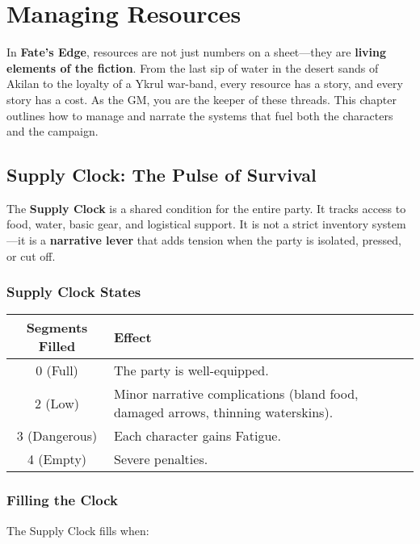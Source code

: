 \chapter{Managing Resources}

In \textbf{Fate's Edge}, resources are not just numbers on a sheet---they are \textbf{living elements of the fiction}. From the last sip of water in the desert sands of Akilan to the loyalty of a Ykrul war-band, every resource has a story, and every story has a cost. As the GM, you are the keeper of these threads. This chapter outlines how to manage and narrate the systems that fuel both the characters and the campaign.

\section*{Supply Clock: The Pulse of Survival}

The \textbf{Supply Clock} is a shared condition for the entire party. It tracks access to food, water, basic gear, and logistical support. It is not a strict inventory system---it is a \textbf{narrative lever} that adds tension when the party is isolated, pressed, or cut off.

\subsection*{Supply Clock States}

\begin{center}
\begin{tabular}{cl}
\toprule
\textbf{Segments Filled} & \textbf{Effect} \\
\midrule
0 (Full) & The party is well-equipped. \\
2 (Low) & Minor narrative complications (bland food, damaged arrows, thinning waterskins). \\
3 (Dangerous) & Each character gains Fatigue\index{Fatigue}. \\
4 (Empty) & Severe penalties. \\
\bottomrule
\end{tabular}
\end{center}

\subsection*{Filling the Clock}

The Supply Clock fills when:

